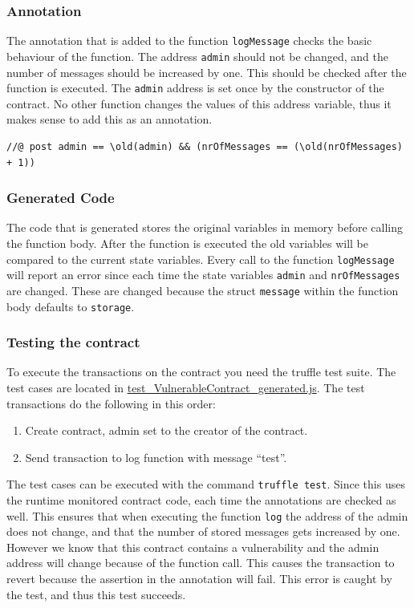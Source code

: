 \documentclass[a4paper]{article}
\begin{document}
\subsubsection{Annotation}
The annotation that is added to the function \texttt{logMessage} checks the basic behaviour of the function. The address \texttt{admin} should not be changed, and the number of messages should be increased by one. This should be checked after the function is executed. The \texttt{admin} address is set once by the constructor of the contract. No other function changes the values of this address variable, thus it makes sense to add this as an annotation.
\begin{lstlisting}[basicstyle=\ttfamily, breaklines=true ]
//@ post admin == \old(admin) && (nrOfMessages == (\old(nrOfMessages) + 1))
\end{lstlisting}
\subsubsection{Generated Code}
The code that is generated stores the original variables in memory before calling the function body. After the function is executed the old variables will be compared to the current state variables. Every call to the function \texttt{logMessage} will report an error since each time the state variables \texttt{admin} and \texttt{nrOfMessages} are changed. These are changed because the struct \texttt{message} within the function body defaults to \texttt{storage}. 


\subsubsection{Testing the contract}
To execute the transactions on the contract you need the truffle test suite. The test cases are located in \href{https://github.com/LarsStegeman/EthereumRuntimeMonitoring/blob/master/src/test/test_VulnerableContract_generated.js}{test\_VulnerableContract\_generated.js}.
The test transactions do the following in this order:
\begin{enumerate}
  \item Create contract, admin set to the creator of the contract.
  \item Send transaction to log function with message ``test''.
\end{enumerate}
The test cases can be executed with the command \texttt{truffle test}. Since this uses the runtime monitored contract code, each time the annotations are checked as well. This ensures that when executing the function \texttt{log} the address of the admin does not change, and that the number of stored messages gets increased by one. However we know that this contract contains a vulnerability and the admin address will change because of the function call. This causes the transaction to revert because the assertion in the annotation will fail. This error is caught by the test, and thus this test succeeds.
\end{document}
